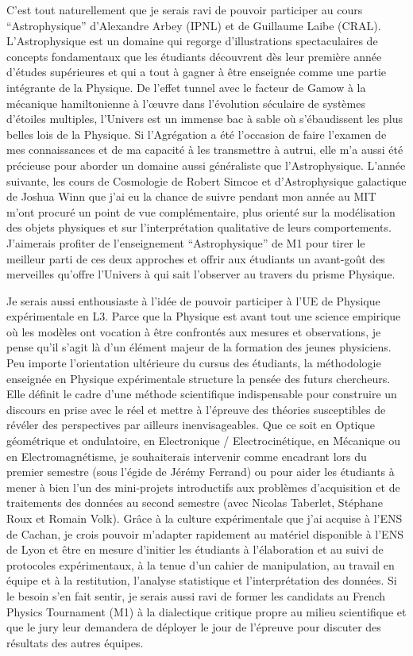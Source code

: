 \documentclass[11pt,onecolumn]{article}
\begin{document}
C’est tout naturellement que je serais ravi de pouvoir participer au cours “Astrophysique” d’Alexandre Arbey (IPNL) et de Guillaume Laibe (CRAL). L’Astrophysique est un domaine qui regorge d’illustrations spectaculaires de concepts fondamentaux que les étudiants découvrent dès leur première année d’études supérieures et qui a tout à gagner à être enseignée comme une partie intégrante de la Physique. De l’effet tunnel avec le facteur de Gamow à la mécanique hamiltonienne à l’\oe{}uvre dans l’évolution séculaire de systèmes d’étoiles multiples, l’Univers est un immense bac à sable où s’ébaudissent les plus belles lois de la Physique. Si l'Agrégation a été l'occasion de faire l'examen de mes connaissances et de ma capacité à les transmettre à autrui, elle m’a aussi été précieuse pour aborder un domaine aussi généraliste que l’Astrophysique. L’année suivante, les cours de Cosmologie de Robert Simcoe et d’Astrophysique galactique de Joshua Winn que j’ai eu la chance de suivre pendant mon année au MIT m’ont procuré un point de vue complémentaire, plus orienté sur la modélisation des objets physiques et sur l’interprétation qualitative de leurs comportements. J’aimerais profiter de l’enseignement “Astrophysique” de M1 pour tirer le meilleur parti de ces deux approches et offrir aux étudiants un avant-goût des merveilles qu’offre l’Univers à qui sait l’observer au travers du prisme Physique.

Je serais aussi enthousiaste à l’idée de pouvoir participer à l’UE de Physique expérimentale en L3. Parce que la Physique est avant tout une science empirique où les modèles ont vocation à être confrontés aux mesures et observations, je pense qu’il s’agit là d’un élément majeur de la formation des jeunes physiciens. Peu importe l’orientation ultérieure du cursus des étudiants, la méthodologie enseignée en Physique expérimentale structure la pensée des futurs chercheurs. Elle définit le cadre d’une méthode scientifique indispensable pour construire un discours en prise avec le réel et mettre à l’épreuve des théories susceptibles de révéler des perspectives par ailleurs inenvisageables. Que ce soit en Optique géométrique et ondulatoire, en Electronique / Electrocinétique, en Mécanique ou en Electromagnétisme, je souhaiterais intervenir comme encadrant lors du premier semestre (sous l’égide de Jérémy Ferrand) ou pour aider les étudiants à mener à bien l’un des mini-projets introductifs aux problèmes d'acquisition et de traitements des données au second semestre (avec Nicolas Taberlet, Stéphane Roux et Romain Volk). Grâce à la culture expérimentale que j’ai acquise à l’ENS de Cachan, je crois pouvoir m’adapter rapidement au matériel disponible à l’ENS de Lyon et être en mesure d’initier les étudiants à l’élaboration et au suivi de protocoles expérimentaux, à la tenue d’un cahier de manipulation, au travail en équipe et à la restitution, l’analyse statistique et l’interprétation des données. Si le besoin s’en fait sentir, je serais aussi ravi de former les candidats au French Physics Tournament (M1) à la dialectique critique propre au milieu scientifique et que le jury leur demandera de déployer le jour de l’épreuve pour discuter des résultats des autres équipes. 
\end{document}
